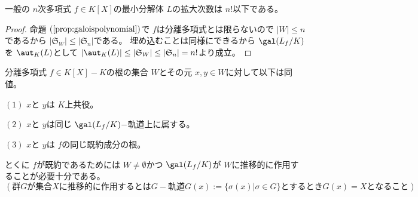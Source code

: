 \documentclass[../master_galois_theory]{subfiles}
\begin{document}
\begin{corl}
  一般の $n$次多項式 $f \in K[X]$の最小分解体 $L$の拡大次数は $n!$以下である。
\end{corl}

\begin{proof}
  命題 $(\mathrm{\ref{prop:galoispolynomial}})$で $f$は分離多項式とは限らないので
  $|W| \leq n$であるから $|\mathfrak{S}_W| \leq |\mathfrak{S}_n|$である。
  埋め込むことは同様にできるから $\gal(L_f/K)$を $\aut_K(L)$として
  $|\aut_K(L)| \leq |\mathfrak{S}_W| \leq |\mathfrak{S}_n| = n!$より成立。
\end{proof}

\begin{prop}
  分離多項式 $f \in K[X] - K$の根の集合 $W$とその元 $x , y \in W$に対して以下は同値。

  $(1)$
  $x$と $y$は $K$上共役。

  $(2)$
  $x$と $y$は同じ $\gal(L_f/K)-$軌道上に属する。

  $(3)$
  $x$と $y$は $f$の同じ既約成分の根。

  とくに $f$が既約であるためには $W \neq \emptyset$かつ $\gal(L_f/K)$が $W$に推移的に作用することが必要十分である。
  $(群 Gが集合 Xに推移的に作用するとは G-軌道 G(x) := \{ \sigma(x) | \sigma \in G \} とするとき G(x) = Xとなること)$
\end{prop}
\end{document}
